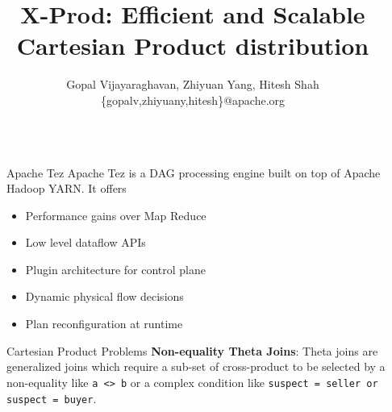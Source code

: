 \documentclass[final]{beamer}
\title{X-Prod: Efficient and Scalable Cartesian Product distribution} %
\author{
Gopal Vijayaraghavan, Zhiyuan Yang, Hitesh Shah \\ 
\{gopalv,zhiyuany,hitesh\}@apache.org
} %
\institute{Apache Tez} %
\newlength{\sepwid}
\newlength{\onecolwid}
\begin{document}

\setlength{\belowcaptionskip}{2ex} %
\setlength\belowdisplayshortskip{2ex} %

\begin{frame}[t] %

\begin{columns}[t] %

\begin{column}{\sepwid}\end{column} %

\begin{column}{\onecolwid} %

\begin{alertblock}{Apache Tez}
Apache Tez
is a DAG processing engine built on top of Apache Hadoop YARN. It offers
\begin{itemize}
\item Performance gains over Map Reduce 
\item Low level dataflow APIs
\item Plugin architecture for control plane
\item Dynamic physical flow decisions
\item Plan reconfiguration at runtime 
\end{itemize}

\end{alertblock}


\begin{block}{Cartesian Product Problems}
\textbf{Non-equality Theta Joins}:
Theta joins are generalized joins which require a sub-set of cross-product to be selected by 
a non-equality like \texttt{a <> b} or a complex condition like \texttt{suspect = seller or suspect = buyer}.


\end{block}
\end{column}
\end{columns}
\end{frame}
\end{document}
